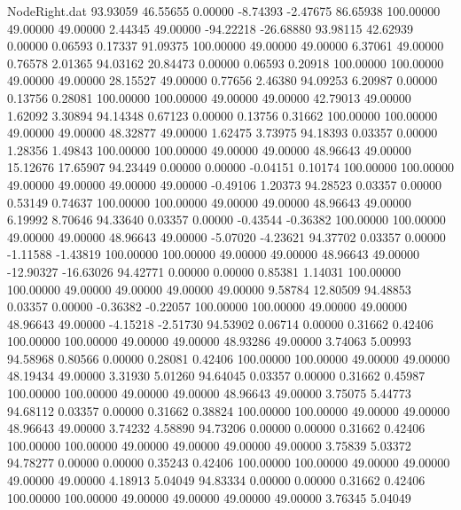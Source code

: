 \begin{filecontents}{NodeRight.dat}
  93.93059   46.55655    0.00000    -8.74393   -2.47675   86.65938  100.00000   49.00000   49.00000    2.44345   49.00000  -94.22218  -26.68880
  93.98115   42.62939    0.00000     0.06593    0.17337   91.09375  100.00000   49.00000   49.00000    6.37061   49.00000    0.76578    2.01365
  94.03162   20.84473    0.00000     0.06593    0.20918  100.00000  100.00000   49.00000   49.00000   28.15527   49.00000    0.77656    2.46380
  94.09253    6.20987    0.00000     0.13756    0.28081  100.00000  100.00000   49.00000   49.00000   42.79013   49.00000    1.62092    3.30894
  94.14348    0.67123    0.00000     0.13756    0.31662  100.00000  100.00000   49.00000   49.00000   48.32877   49.00000    1.62475    3.73975
  94.18393    0.03357    0.00000     1.28356    1.49843  100.00000  100.00000   49.00000   49.00000   48.96643   49.00000   15.12676   17.65907
  94.23449    0.00000    0.00000    -0.04151    0.10174  100.00000  100.00000   49.00000   49.00000   49.00000   49.00000   -0.49106    1.20373
  94.28523    0.03357    0.00000     0.53149    0.74637  100.00000  100.00000   49.00000   49.00000   48.96643   49.00000    6.19992    8.70646
  94.33640    0.03357    0.00000    -0.43544   -0.36382  100.00000  100.00000   49.00000   49.00000   48.96643   49.00000   -5.07020   -4.23621
  94.37702    0.03357    0.00000    -1.11588   -1.43819  100.00000  100.00000   49.00000   49.00000   48.96643   49.00000  -12.90327  -16.63026
  94.42771    0.00000    0.00000     0.85381    1.14031  100.00000  100.00000   49.00000   49.00000   49.00000   49.00000    9.58784   12.80509
  94.48853    0.03357    0.00000    -0.36382   -0.22057  100.00000  100.00000   49.00000   49.00000   48.96643   49.00000   -4.15218   -2.51730
  94.53902    0.06714    0.00000     0.31662    0.42406  100.00000  100.00000   49.00000   49.00000   48.93286   49.00000    3.74063    5.00993
  94.58968    0.80566    0.00000     0.28081    0.42406  100.00000  100.00000   49.00000   49.00000   48.19434   49.00000    3.31930    5.01260
  94.64045    0.03357    0.00000     0.31662    0.45987  100.00000  100.00000   49.00000   49.00000   48.96643   49.00000    3.75075    5.44773
  94.68112    0.03357    0.00000     0.31662    0.38824  100.00000  100.00000   49.00000   49.00000   48.96643   49.00000    3.74232    4.58890
  94.73206    0.00000    0.00000     0.31662    0.42406  100.00000  100.00000   49.00000   49.00000   49.00000   49.00000    3.75839    5.03372
  94.78277    0.00000    0.00000     0.35243    0.42406  100.00000  100.00000   49.00000   49.00000   49.00000   49.00000    4.18913    5.04049
  94.83334    0.00000    0.00000     0.31662    0.42406  100.00000  100.00000   49.00000   49.00000   49.00000   49.00000    3.76345    5.04049

\end{filecontents}
